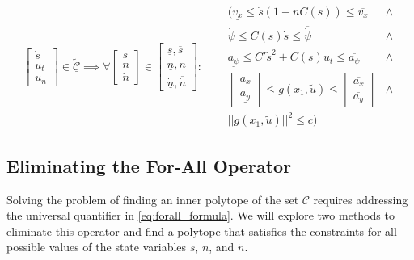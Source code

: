 \begin{equation}
	\label{eq:forall_formula}
	\begin{bmatrix}
		\dot{s} \\
		u_t     \\
		u_n
	\end{bmatrix} \in \tilde{\underline{\mathcal{C}}}
	\implies
	\forall  \begin{bmatrix}
		s \\
		n \\
		\dot{n}
	\end{bmatrix} \in \begin{bmatrix}
		\underline{s}, \overline{s} \\
		\underline{n}, \overline{n} \\
		\underline{\dot{n}},  \overline{\dot{n}}
	\end{bmatrix}: \quad
	\begin{aligned}
		 & (\underline{v_x}  \leq  \dot{s}(1-nC(s))  \leq  \overline{v_x}             & \land \\
		 & \underline{\dot{\psi}} \leq C(s) \dot{s} \leq \overline{\dot{\psi}}        & \land \\
		 & \underline{a_{\psi}} \leq C' \dot{s}^2 + C(s) u_t \leq \overline{a_{\psi}} & \land \\
		 & \begin{bmatrix}
			   \underline{a_x} \\ \underline{a_y}
		   \end{bmatrix} \leq g(x_1, \tilde{u}) \leq \begin{bmatrix}
			                                             \overline{a_x} \\\overline{a_y}
		                                             \end{bmatrix}                  & \land   \\
		 & ||g(x_1, \tilde{u})||^2 \leq c )
	\end{aligned}
\end{equation}

\subsection{Eliminating the For-All Operator} \label{subsec:eliminating_the_for_all_operator}

Solving the problem of finding an inner polytope of the set $\mathcal{C}$ requires addressing the universal quantifier in \eqref{eq:forall_formula}.
We will explore two methods to eliminate this operator and find a polytope that satisfies the constraints for all possible values of the state
variables $s$, $n$, and $\dot{n}$.

